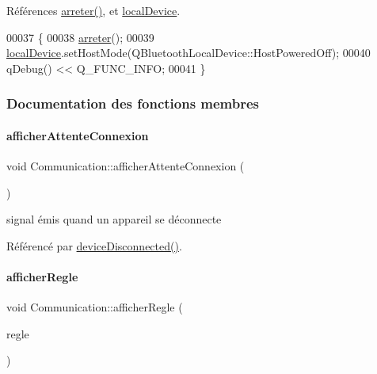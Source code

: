 Références \hyperlink{communication_8cpp_source_l00121}{arreter()}, et \hyperlink{communication_8h_source_l00096}{local\+Device}.


\begin{DoxyCode}
00037 \{
00038     \hyperlink{class_communication_a1f4b02441803f9c8e231cb9f304d776b}{arreter}();
00039     \hyperlink{class_communication_a6281796eab7523bef6be1a766e0e906f}{localDevice}.setHostMode(QBluetoothLocalDevice::HostPoweredOff);
00040     qDebug() << Q\_FUNC\_INFO;
00041 \}
\end{DoxyCode}


\subsubsection{Documentation des fonctions membres}
\mbox{\label{class_communication_aff862483641966b73aa713b419b819a9}} 
\paragraph{\texorpdfstring{afficher\+Attente\+Connexion}{afficherAttenteConnexion}}
{\footnotesize\ttfamily void Communication\+::afficher\+Attente\+Connexion (\begin{DoxyParamCaption}{ }\end{DoxyParamCaption})\hspace{0.3cm}{\ttfamily [signal]}}



signal émis quand un appareil se déconnecte 



Référencé par \hyperlink{communication_8cpp_source_l00353}{device\+Disconnected()}.

\mbox{\label{class_communication_a4ee52f9b4a1a97967ab2c48a33e0e392}} 
\paragraph{\texorpdfstring{afficher\+Regle}{afficherRegle}}
{\footnotesize\ttfamily void Communication\+::afficher\+Regle (\begin{DoxyParamCaption}\item[{Q\+String}]{regle }\end{DoxyParamCaption})\hspace{0.3cm}{\ttfamily [signal]}}



